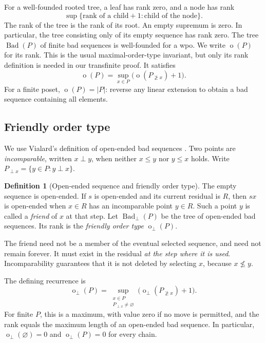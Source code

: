 \documentclass[11pt,a4paper]{article}
\theoremstyle{definition}
\newtheorem{definition}[theorem]{Definition}
\theoremstyle{remark}
\newcommand{\fot}{\operatorname{o}_{\perp}}
\newcommand{\mot}{\operatorname{o}}
\newcommand{\Bad}{\operatorname{Bad}}
\newcommand{\Fr}{\operatorname{Bad}_{\perp}}
\newcommand{\res}[2]{#1_{\not\ge #2}}
\begin{document}
For a well-founded rooted tree, a leaf has rank zero, and a node has rank
\[
 \sup\{\text{rank of a child}+1:\text{child of the node}\}.
\]
The rank of the tree is the rank of its root. An empty supremum is zero.
In particular, the tree consisting only of its empty sequence has rank zero.
The tree $\Bad(P)$ of finite bad sequences is well-founded for a wpo.
We write $\mot(P)$ for its rank. This is the usual maximal-order-type
invariant, but only its rank definition is needed in our transfinite proof.
It satisfies
\begin{equation}\label{eq:mot}
 \mot(P)=\sup_{x\in P}\bigl(\mot(\res{P}{x})+1\bigr).
\end{equation}
For a finite poset, $\mot(P)=|P|$: reverse any linear extension to obtain a
bad sequence containing all elements.

\subsection{Friendly order type}

We use Vialard's definition of open-ended bad sequences
\cite[Definition~5.3.2]{vialard2024}.
Two points are \emph{incomparable}, written $x\perp y$, when neither
$x\le y$ nor $y\le x$ holds. Write
$P_{\perp x}=\{y\in P:y\perp x\}$.

\begin{definition}[Open-ended sequence and friendly order type]
The empty sequence is open-ended. If $s$ is open-ended and its current
residual is $R$, then $sx$ is open-ended when $x\in R$ has an incomparable
point $y\in R$. Such a point $y$ is called a \emph{friend} of $x$ at that
step. Let $\Fr(P)$ be the tree of open-ended bad sequences. Its rank is the
\emph{friendly order type} $\fot(P)$.
\end{definition}

The friend need not be a member of the eventual selected sequence, and need
not remain forever. It must exist in the residual \emph{at the step where
it is used}. Incomparability guarantees that it is not deleted by selecting
$x$, because $x\not\le y$.

The defining recurrence is
\begin{equation}\label{eq:fot}
 \fot(P)=\sup_{\substack{x\in P\\P_{\perp x}\ne\varnothing}}
 \bigl(\fot(\res{P}{x})+1\bigr).
\end{equation}
For finite $P$, this is a maximum, with value zero if no move is permitted,
and the rank equals the maximum length of an open-ended bad sequence.
In particular, $\fot(\varnothing)=0$ and $\fot(P)=0$ for every chain.
\end{document}
